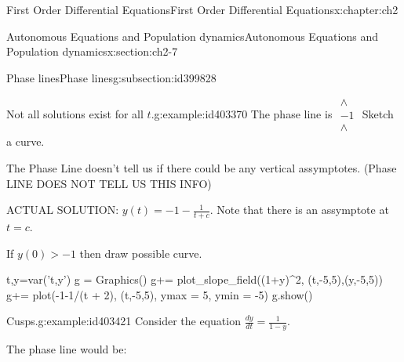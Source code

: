 \documentclass[oneside,10pt,]{book}
\numberwithin{equation}{section}
\numberwithin{equation}{section}
\begin{document}
\begin{chapterptx}{First Order Differential Equations}{}{First Order Differential Equations}{}{}{x:chapter:ch2}
\begin{sectionptx}{Autonomous Equations and Population dynamics}{}{Autonomous Equations and Population dynamics}{}{}{x:section:ch2-7}
\begin{subsectionptx}{Phase lines}{}{Phase lines}{}{}{g:subsection:id399828}
\begin{example}{Not all solutions exist for all \(t\).}{g:example:id403370}
The phase line is  \(\begin{array}{c}
\wedge\\
-1\\
\wedge
\end{array}\) Sketch a curve.%
\par
The Phase Line doesn't tell us if there could be any vertical assymptotes. (Phase LINE DOES NOT TELL US THIS INFO)%
\par
ACTUAL SOLUTION: \(y(t)=-1-\frac{1}{t+c}\). Note that there is an assymptote at \(t=c\).%
\par
If \(y(0)>-1\) then draw possible curve.%
\begin{sageinput}
t,y=var('t,y')
g = Graphics()
g+= plot_slope_field((1+y)^2, (t,-5,5),(y,-5,5))
g+= plot(-1-1/(t + 2), (t,-5,5), ymax = 5, ymin = -5)
g.show()
\end{sageinput}
\end{example}
\begin{example}{Cusps.}{g:example:id403421}%
Consider the equation \(\frac{dy}{dt}=\frac{1}{1-y}\).%
\par
The phase line would be: \begin{image}{0.35}{0.3}{0.35}%

\end{image}
\end{example}
\end{subsectionptx}
\end{sectionptx}
\end{chapterptx}
\end{document}

